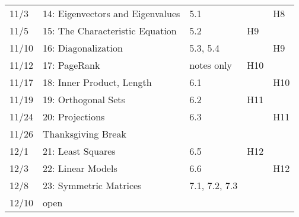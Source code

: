 \documentclass[11pt]{article}
\begin{document}
\begin{centering}
\begin{tabular}{||l|p{3in}|l|l|l||}
11/3 & 14: Eigenvectors and Eigenvalues & 5.1 &  & H8\\ 
11/5 & 15: The Characteristic Equation & 5.2 & H9 &\\ 
\hline

11/10 & 16: Diagonalization & 5.3, 5.4 & & H9\\ 
11/12 & 17: PageRank & notes only & H10 &\\  %
\hline

11/17 & 18: Inner Product, Length & 6.1 & & H10\\
11/19 & 19: Orthogonal Sets & 6.2 & H11 &\\ 
 \hline

11/24 & 20: Projections & 6.3 & & H11\\ 
11/26 & Thanksgiving Break &&&\\
\hline 

12/1 & 21: Least Squares & 6.5 & H12 & \\
12/3 & 22: Linear Models & 6.6 & & H12\\ 
\hline  
 12/8 & 23: Symmetric Matrices & 7.1, 7.2, 7.3 &  &\\ 
12/10 & open &  &  &\\ 
\hline\hline


\end{tabular}\\
\end{centering}
\end{document}

